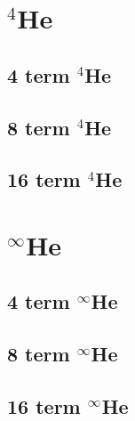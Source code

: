 \documentclass[12pt,thmsa,suthesis,verbatim]{report}
\begin{document}
\section{$^4$He}

\subsection{4 term $^4$He}

{\normalsize \renewcommand{\baselinestretch}{1} \footnotesize %
 }

\subsection{8 term $^4$He}

{\normalsize \renewcommand{\baselinestretch}{1} \footnotesize %
 }

\subsection{16 term $^4$He}

{\normalsize \renewcommand{\baselinestretch}{1} \footnotesize %
 }

\section{$^\infty $He}

\subsection{4 term $^\infty $He}

{\normalsize \renewcommand{\baselinestretch}{1} \footnotesize %
 }

\subsection{8 term $^\infty $He}

{\normalsize \renewcommand{\baselinestretch}{1} \footnotesize %
 }

\subsection{16 term $^\infty $He}

{\normalsize \renewcommand{\baselinestretch}{1} \footnotesize %
 }
\end{document}

